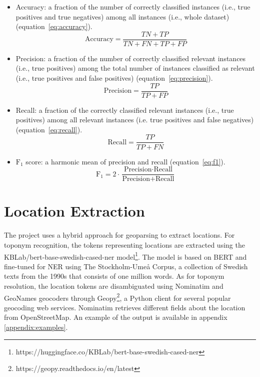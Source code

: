 \begin{itemize}
  \item Accuracy: a fraction of the number of correctly classified instances (i.e., true positives
    and true negatives) among all instances (i.e., whole dataset) (equation~\ref{eq:accuracy}).
    \begin{equation}
      \text{Accuracy}=\frac{TN+TP}{TN+FN+TP+FP} 
      \label{eq:accuracy}
    \end{equation}
  \item Precision: a fraction of the number of correctly classified relevant instances (i.e., true
    positives) among the total number of instances classified as relevant (i.e., true positives and
    false positives) (equation~\ref{eq:precision}).
    \begin{equation}
      \text{Precision}=\frac{TP}{TP+FP} 
      \label{eq:precision}
    \end{equation}
  \item Recall: a fraction of the correctly classified relevant instances (i.e., true positives)
    among all relevant instances (i.e. true positives and false negatives) (equation~\ref{eq:recall}).
    \begin{equation}
      \text{Recall}=\frac{TP}{TP+FN} 
      \label{eq:recall}
    \end{equation}
  \item $\text{F}_1$ score: a harmonic mean of precision and recall (equation~\ref{eq:f1}).
    \begin{equation}
      \text{F}_1 =2\cdot\frac{\text{Precision}\cdot\text{Recall}}{\text{Precision}+\text{Recall}} 
      \label{eq:f1}
    \end{equation}
\end{itemize}


\section{Location Extraction}

The project uses a hybrid approach for geoparsing to extract locations. For toponym recognition, the
tokens representing locations are extracted using the KBLab/bert-base-swedish-cased-ner
model\footnote{https://huggingface.co/KBLab/bert-base-swedish-cased-ner}. The model is based on BERT
and fine-tuned for \ac{NER} using The Stockholm-Umeå Corpus, a collection of Swedish texts from the
1990s that consists of one million words. As for toponym resolution, the location tokens are
disambiguated using Nominatim and GeoNames geocoders through
Geopy\footnote{https://geopy.readthedocs.io/en/latest}, a Python client for several
popular geocoding web services. Nominatim retrieves different fields about the
location from OpenStreetMap. An example of the output is available in appendix
\ref{appendix:examples}.


